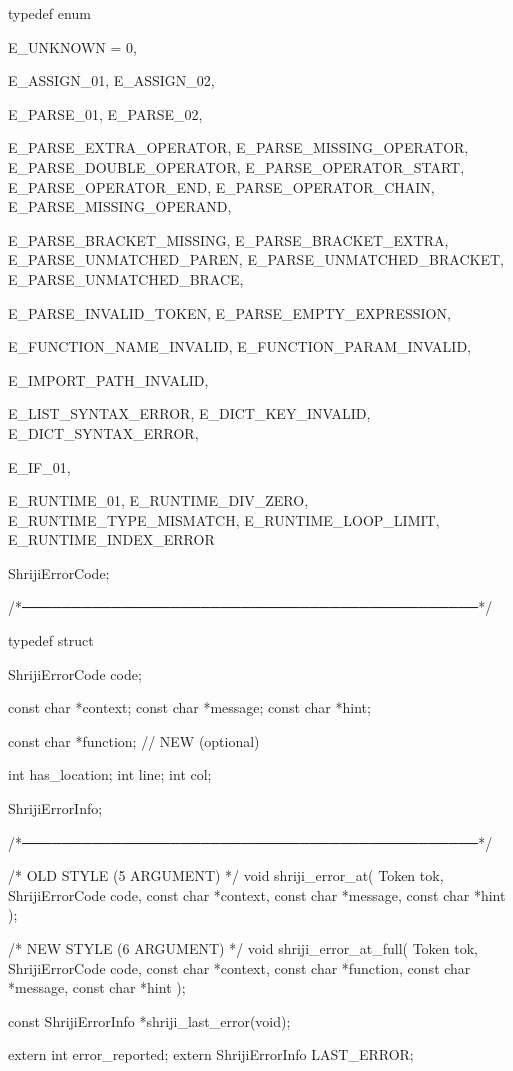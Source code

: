 \documentclass{article}
\begin{document}
typedef enum {

    E_UNKNOWN = 0,

    E_ASSIGN_01,
    E_ASSIGN_02,

    E_PARSE_01,
    E_PARSE_02,

    E_PARSE_EXTRA_OPERATOR,
    E_PARSE_MISSING_OPERATOR,
    E_PARSE_DOUBLE_OPERATOR,
    E_PARSE_OPERATOR_START,
    E_PARSE_OPERATOR_END,
    E_PARSE_OPERATOR_CHAIN,
    E_PARSE_MISSING_OPERAND,

    E_PARSE_BRACKET_MISSING,
    E_PARSE_BRACKET_EXTRA,
    E_PARSE_UNMATCHED_PAREN,
    E_PARSE_UNMATCHED_BRACKET,
    E_PARSE_UNMATCHED_BRACE,

    E_PARSE_INVALID_TOKEN,
    E_PARSE_EMPTY_EXPRESSION,

    E_FUNCTION_NAME_INVALID,
    E_FUNCTION_PARAM_INVALID,

    E_IMPORT_PATH_INVALID,

    E_LIST_SYNTAX_ERROR,
    E_DICT_KEY_INVALID,
    E_DICT_SYNTAX_ERROR,

    E_IF_01,

    E_RUNTIME_01,
    E_RUNTIME_DIV_ZERO,
    E_RUNTIME_TYPE_MISMATCH,
    E_RUNTIME_LOOP_LIMIT,
    E_RUNTIME_INDEX_ERROR

} ShrijiErrorCode;


/*──────────────────────────────────────────────*/

typedef struct {

    ShrijiErrorCode code;

    const char *context;
    const char *message;
    const char *hint;

    const char *function;   // NEW (optional)

    int has_location;
    int line;
    int col;

} ShrijiErrorInfo;


/*──────────────────────────────────────────────*/

/* OLD STYLE (5 ARGUMENT) */
void shriji_error_at(
    Token tok,
    ShrijiErrorCode code,
    const char *context,
    const char *message,
    const char *hint
);

/* NEW STYLE (6 ARGUMENT) */
void shriji_error_at_full(
    Token tok,
    ShrijiErrorCode code,
    const char *context,
    const char *function,
    const char *message,
    const char *hint
);

const ShrijiErrorInfo *shriji_last_error(void);

extern int error_reported;
extern ShrijiErrorInfo LAST_ERROR;
\end{document}

